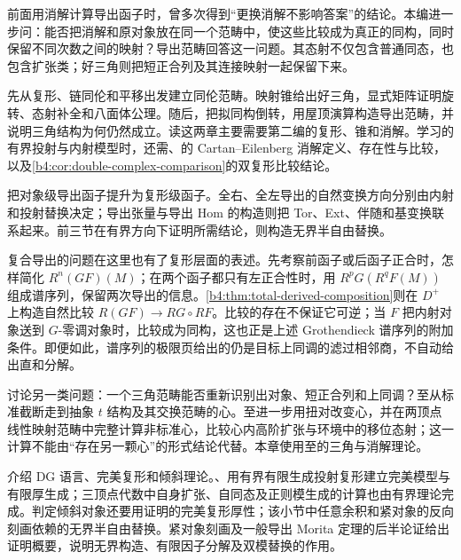
\BookPartGuide
前面用消解计算导出函子时，曾多次得到“更换消解不影响答案”的结论。本编进一步问：能否把消解和原对象放在同一个范畴中，使这些比较成为真正的同构，同时保留不同次数之间的映射？导出范畴回答这一问题。其态射不仅包含普通同态，也包含扩张类；好三角则把短正合列及其连接映射一起保留下来。

\ProseParagraphBreak
{}先从复形、链同伦和平移出发建立同伦范畴。映射锥给出好三角，显式矩阵证明旋转、态射补全和八面体公理。随后，把拟同构倒转，用屋顶演算构造导出范畴，并说明三角结构为何仍然成立。读这两章主要需要第二编的复形、锥和消解。学习的有界投射与内射模型时，还需、的 Cartan--Eilenberg 消解定义、存在性与比较，以及\cref{b4:cor:double-complex-comparison}的双复形比较结论。

\ProseParagraphBreak
{}把对象级导出函子提升为复形级函子。全右、全左导出的自然变换方向分别由内射和投射替换决定；导出张量与导出 Hom 的构造则把 Tor、Ext、伴随和基变换联系起来。前三节在有界方向下证明所需结论，则构造无界半自由替换。

\ProseParagraphBreak
复合导出的问题在这里也有了复形层面的表述。先考察前函子或后函子正合时，怎样简化 \(R^n(GF)(M)\)；在两个函子都只有左正合性时，用 \(R^pG(R^qF(M))\) 组成谱序列，保留两次导出的信息。\cref{b4:thm:total-derived-composition}则在 \(D^+\) 上构造自然比较 \(R(GF)\to RG\circ RF\)。比较的存在不保证它可逆；当 \(F\) 把内射对象送到 \(G\)-零调对象时，比较成为同构，这也正是上述 Grothendieck 谱序列的附加条件。即便如此，谱序列的极限页给出的仍是目标上同调的滤过相邻商，不自动给出直和分解。

\ProseParagraphBreak
{}讨论另一类问题：一个三角范畴能否重新识别出对象、短正合列和上同调？至从标准截断走到抽象 \(t\) 结构及其交换范畴的心。至进一步用扭对改变心，并在两顶点线性映射范畴中完整计算非标准心，比较心内高阶扩张与环境中的移位态射；这一计算不能由“存在另一颗心”的形式结论代替。本章使用至的三角与消解理论。

\ProseParagraphBreak
{}介绍 DG 语言、完美复形和倾斜理论。、用有界有限生成投射复形建立完美模型与有限厚生成；三顶点代数中自身扩张、自同态及正则模生成的计算也由有界理论完成。判定倾斜对象还要用证明的完美复形厚性；该小节中任意余积和紧对象的反向刻画依赖的无界半自由替换。紧对象刻画及一般导出 Morita 定理的后半论证给出证明概要，说明无界构造、有限因子分解及双模替换的作用。

